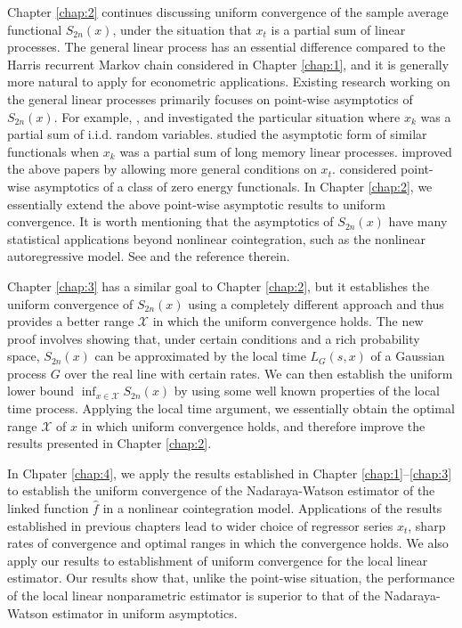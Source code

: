 Chapter \ref{chap:2} continues discussing uniform convergence of the sample average functional $S_{2n}(x)$, under the situation that $x_t$ is a partial sum of linear processes. The general linear process has an essential difference compared to the Harris recurrent Markov chain considered in Chapter \ref{chap:1}, and it is generally more natural to apply for econometric applications. Existing research working on the general linear processes primarily focuses on point-wise asymptotics of $S_{2n}(x)$. For example, \cite{borodinibragimov1995}, \cite{akonom1993} and \cite{phillipspark1998} investigated the particular situation where $x_{k}$ was a partial sum of i.i.d. random variables. \cite{jeganathan2004} studied the asymptotic form of similar functionals when $x_{k}$ was a partial sum of long memory linear processes. \cite{wangphillips2010a} improved the above papers by allowing more general conditions on $x_t$.  \cite{wangphillips2010b} considered point-wise asymptotics of a class of zero energy functionals.  In Chapter \ref{chap:2}, we essentially extend the above point-wise asymptotic results to uniform convergence. It is worth mentioning that the asymptotics of $S_{2n}(x)$ have many statistical applications beyond nonlinear cointegration, such as the nonlinear autoregressive model. See \citet[][\citeyear{wangphillips2012}]{wangphillips2010b} and the reference therein.


Chapter \ref{chap:3} has a similar goal to Chapter \ref{chap:2}, but it establishes the uniform convergence of $S_{2n}(x)$ using a completely different approach and thus provides a better range $\mathcal X$ in which the uniform convergence holds. The new proof involves showing that, under certain conditions and a rich probability space, $S_{2n}(x)$ can be approximated by the local time $L_G(s, x)$ of a Gaussian process $G$ over the real line with certain rates.  We can then establish the uniform lower bound $\inf_{x \in \mathcal X} S_{2n}(x)$ by using some well known properties of the local time process. Applying the local time argument, we essentially obtain the optimal range $\mathcal{X}$ of $x$ in which uniform convergence holds, and therefore improve the results presented in Chapter \ref{chap:2}.

In Chpater \ref{chap:4}, we apply the results established in Chapter \ref{chap:1}--\ref{chap:3} to establish the uniform convergence of the Nadaraya-Watson estimator of the linked function $\widehat{f}$ in a nonlinear cointegration model. Applications of the results established in previous chapters lead to wider choice of regressor series $x_t$, sharp rates of convergence and optimal ranges in which the convergence holds. We also apply our results to establishment of uniform convergence for the local linear estimator. Our results show that, unlike the point-wise situation, the performance of the local linear nonparametric  estimator is superior to that of the Nadaraya-Watson estimator in uniform asymptotics. 


